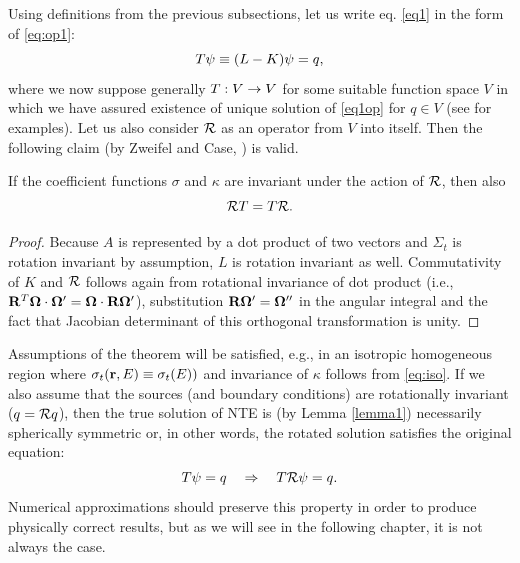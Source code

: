 Using definitions from the previous subsections, let us write eq. \eqref{eq1} in the form of \eqref{eq:op1}:
\begin{equation}\label{eq1op}
	T\psi \equiv (L - K)\psi = q,
\end{equation} 
where we now suppose generally $T:V\to V$ for some suitable function space $V$ in which we have assured existence
of unique solution of \eqref{eq1op} for $q \in V$ (see  for examples). Let us also consider 
$\mathcal{R}$ as an operator from $V$ into itself. Then the following claim (by Zweifel and Case, \cite[Theorem
3]{Zweifel}) is valid.
\begin{theorem}\label{thm:rotinv}
	If the coefficient functions $\sigma$ and $\kappa$ are invariant under the action of $\mathcal{R}$, then also
	\begin{equation}\label{eq:commut_NTE}
		\mathcal{R}T = T\mathcal{R}.
	\end{equation}
\end{theorem}
\begin{proof}
Because $A$ is represented by a dot product of two vectors and $\Sigma_t$ is rotation invariant by
assumption, $L$ is rotation invariant as well. Commutativity of $K$ and $\mathcal{R}$ follows again from rotational
invariance of dot product (i.e., \linebreak$\mathbf{R}^T\mathbf{\Omega}\cdot\mathbf{\Omega}' = \mathbf{\Omega}\cdot\mathbf{R}\mathbf{\Omega}'$),
substitution $\mathbf{R}\mathbf{\Omega}' = \mathbf{\Omega}''$ in the angular integral and the fact that Jacobian determinant of this
orthogonal transformation is unity.
\end{proof}

Assumptions of the theorem will be satisfied, e.g., in an isotropic homogeneous region where  $\sigma_t(\mathbf{r},E) \equiv
\sigma_t(E))$ and invariance of $\kappa$ follows from \eqref{eq:iso}. If we also assume that the sources (and
boundary conditions) are  rotationally invariant ($q = \mathcal{R}q$), then the true solution of NTE is (by Lemma
\ref{lemma1}) necessarily spherically symmetric or, in other words, the rotated solution satisfies the original
equation:
$$
T\psi = q \quad \Rightarrow \quad T\mathcal{R}\psi = q.
$$
Numerical approximations should preserve this property in order to produce physically correct results, but as we will
see in the following chapter, it is not always the case.
